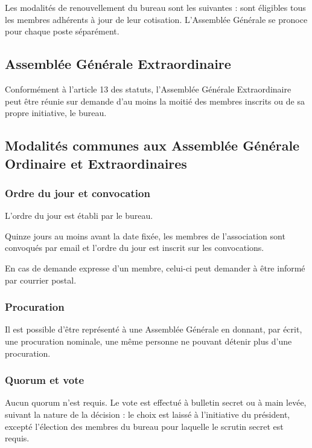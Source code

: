 \documentclass[a4paper,french,10pt]{article}
\begin{document}
Les modalités de renouvellement du bureau sont les suivantes : sont éligibles tous les membres adhérents à jour de leur cotisation. L'Assemblée Générale se pronoce pour chaque poste séparément.

\subsection{Assemblée Générale Extraordinaire}
\label{sec:age}
Conformément à l'article 13 des statuts, l'Assemblée Générale Extraordinaire peut être réunie sur demande d'au moins la moitié des membres inscrits ou de sa propre initiative, le bureau.

\subsection{Modalités communes aux Assemblée Générale Ordinaire et Extraordinaires}
\label{sec:ag}

\subsubsection*{Ordre du jour et convocation}
\label{sec:ordre-du-jour-1}

L'ordre du jour est établi par le bureau.

Quinze jours au moins avant la date fixée, les membres de
l’association sont convoqués par email et l’ordre du jour est inscrit
sur les convocations.

En cas de demande expresse d'un membre, celui-ci peut demander à être
informé par courrier postal.

\subsubsection*{Procuration}
\label{sec:procuration}

Il est possible d’être représenté à une Assemblée Générale en donnant,
par écrit, une procuration nominale, une même personne ne pouvant détenir plus
d’une procuration.

\subsubsection{Quorum et vote}
\label{sec:quorum}

Aucun quorum n'est requis. Le vote est effectué à bulletin secret ou à
main levée, suivant la nature de la décision : le choix est laissé à
l'initiative du président, excepté l'élection des membres du bureau
pour laquelle le scrutin secret est requis.
\end{document}
